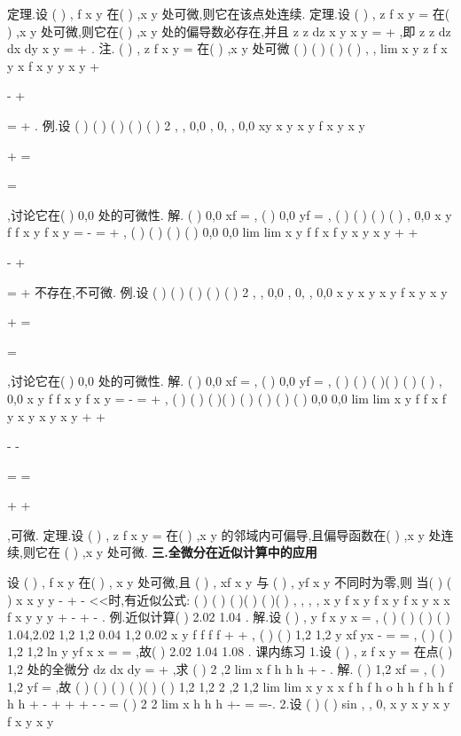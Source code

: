 \textcolor{lyred}{定理}.设
(
)
,
f x y 在(
)
,x y 处可微,则它在该点处连续. 
\textcolor{lyred}{定理}.设
(
)
,
z
f x y
=
在(
)
,x y 处可微,则它在(
)
,x y 处的偏导数必存在,并且 
z
z
dz
x
y
x
y
\partial 
\partial 
=
\Delta +
\Delta 
\partial 
\partial 
,即
z
z
dz
dx
dy
x
y
\partial 
\partial 
=
+
\partial 
\partial 
. 
\textcolor{lyred}{注}.
(
)
,
z
f x y
=
在(
)
,x y 处可微
(
)
(
)
(
)
(
)
,
,
lim
x
y
z
f
x y
x
f
x y
y
x
y
\rho 
+
\to 


\Delta -
\Delta +
\Delta 


\Leftrightarrow 
=
\Delta 
+\Delta 
. 
\textcolor{lyred}{例}.设
(
)
(
)
(
)
(
)
(
)
2 ,
,
0,0
,
0,
,
0,0
xy
x y
x
y
f x y
x y

\neq 

+
=

=

,讨论它在(
)
0,0 处的可微性. 
解.
(
)
0,0
xf
=
,
(
)
0,0
yf
=
,
(
)
(
)
(
)
(
)
,
0,0
x y
f
f
x
y
f
x
y
\Delta \Delta 
\Delta =
\Delta 
\Delta 
-
=
\Delta 
+\Delta 
, 
(
)
(
)
(
)
(
)
0,0
0,0
lim
lim
x
y
f
f
x
f
y
x y
x
y
\rho 
\rho 
\rho 
+
+
\to 
\to 


\Delta -
\Delta +
\Delta 
\Delta \Delta 

=
\Delta 
+\Delta 
不存在,不可微. 
\textcolor{lyred}{例}.设
(
)
(
)
(
)
(
)
(
)
2 ,
,
0,0
,
0,
,
0,0
x y
x y
x
y
f x y
x y

\neq 

+
=

=

,讨论它在(
)
0,0 处的可微性. 
解.
(
)
0,0
xf
=
,
(
)
0,0
yf
=
,
(
)
(
)
(
)(
)
(
)
(
)
,
0,0
x
y
f
f
x
y
f
x
y
\Delta 
\Delta 
\Delta =
\Delta 
\Delta 
-
=
\Delta 
+\Delta 
, 
(
)
(
)
(
)(
)
(
)
(
)
(
)
(
)
0,0
0,0
lim
lim
x
y
f
f
x
f
y
x
y
x
y
x
y
\rho 
\rho 
\rho 
+
+
\to 
\to 


\Delta -
\Delta -
\Delta 
\Delta 
\Delta 

=
=


\Delta 
+\Delta 
\Delta 
+\Delta 


,可微. 
\textcolor{lyred}{定理}.设
(
)
,
z
f x y
=
在(
)
,x y 的邻域内可偏导,且偏导函数在(
)
,x y 处连续,则它在 
(
)
,x y 处可微. 
\vspace{4pt}
{\bfseries \textcolor{lyred}{三.全微分在近似计算中的应用}}

设
(
)
,
f x y 在(
)
,
x
y
处可微,且
(
)
,
xf
x
y
与
(
)
,
yf
x
y
不同时为零,则 
当(
)
(
)
x
x
y
y
-
+
-
<<时,有近似公式: 
(
)
(
)
(
)(
)
(
)(
)
,
,
,
,
x
y
f x y
f x
y
f
x
y
x
x
f
x
y
y
y
\approx 
+
-
+
-
. 
\textcolor{lyred}{例}.近似计算(
)
2.02
1.04
. 
解.设
(
)
,
y
f x y
x
=
,
(
)
(
)
(
)
(
)
1.04,2.02
1,2
1,2
0.04
1,2
0.02
x
y
f
f
f
f
\approx 
+
\cdots 
+
\cdots 
, 
(
)
(
)
1,2
1,2
y
xf
yx -
=
=
,
(
)
(
)
1,2
1,2
ln
y
yf
x
x
=
=
,故(
)
2.02
1.04
1.08
\approx 
. 
\textcolor{lyred}{课内练习 }
1.设
(
)
,
z
f x y
=
在点(
)
1,2 处的全微分
dz
dx
dy
=
+
,求
(
)
2 ,2
lim
x
f
h
h
h
\to 
+
-
. 
解.
(
)
1,2
xf
=
,
(
)
1,2
yf
=
,故 
(
)
(
)
(
)
(
)(
)
(
)
1,2
1,2
2 ,2
1,2
lim
lim
x
y
x
x
f
h
f
h
o
h
h
f
h
h
f
h
h
\to 
\to 
\cdots 
+
\cdots -
+
+
+
-
-
=
(
)
2 2
lim
x
h
h
h
\to 
\cdots 
+\cdots -
=
=-. 
2.设
(
)
(
)
sin
,
,
0,
x
y
x
y
x
y
f x y
x
y

